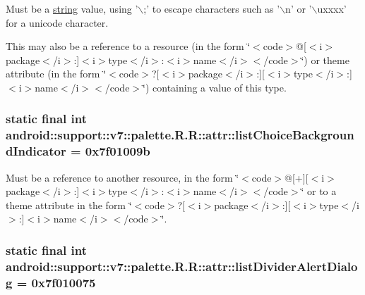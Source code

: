 Must be a \hyperlink{classandroid_1_1support_1_1v7_1_1palette_1_1_r_1_1string}{string} value, using '$\backslash$;' to escape characters such as '$\backslash$n' or '$\backslash$uxxxx' for a unicode character. 

This may also be a reference to a resource (in the form \char`\"{}$<$code$>$@\mbox{[}$<$i$>$package$<$/i$>$:\mbox{]}$<$i$>$type$<$/i$>$:$<$i$>$name$<$/i$>$$<$/code$>$\char`\"{}) or theme attribute (in the form \char`\"{}$<$code$>$?\mbox{[}$<$i$>$package$<$/i$>$:\mbox{]}\mbox{[}$<$i$>$type$<$/i$>$:\mbox{]}$<$i$>$name$<$/i$>$$<$/code$>$\char`\"{}) containing a value of this type. \hypertarget{classandroid_1_1support_1_1v7_1_1palette_1_1_r_1_1attr_920f2dd4c3b33062d8f7faa090806f9f}{
\subsubsection[{listChoiceBackgroundIndicator}]{\setlength{\rightskip}{0pt plus 5cm}static final int android::support::v7::palette.R.R::attr::listChoiceBackgroundIndicator = 0x7f01009b}}
\label{classandroid_1_1support_1_1v7_1_1palette_1_1_r_1_1attr_920f2dd4c3b33062d8f7faa090806f9f}


Must be a reference to another resource, in the form \char`\"{}$<$code$>$@\mbox{[}+\mbox{]}\mbox{[}$<$i$>$package$<$/i$>$:\mbox{]}$<$i$>$type$<$/i$>$:$<$i$>$name$<$/i$>$$<$/code$>$\char`\"{} or to a theme attribute in the form \char`\"{}$<$code$>$?\mbox{[}$<$i$>$package$<$/i$>$:\mbox{]}\mbox{[}$<$i$>$type$<$/i$>$:\mbox{]}$<$i$>$name$<$/i$>$$<$/code$>$\char`\"{}. \hypertarget{classandroid_1_1support_1_1v7_1_1palette_1_1_r_1_1attr_2dff2357662e9538fd2b478dae3de9e0}{
\subsubsection[{listDividerAlertDialog}]{\setlength{\rightskip}{0pt plus 5cm}static final int android::support::v7::palette.R.R::attr::listDividerAlertDialog = 0x7f010075}}
\label{classandroid_1_1support_1_1v7_1_1palette_1_1_r_1_1attr_2dff2357662e9538fd2b478dae3de9e0}


